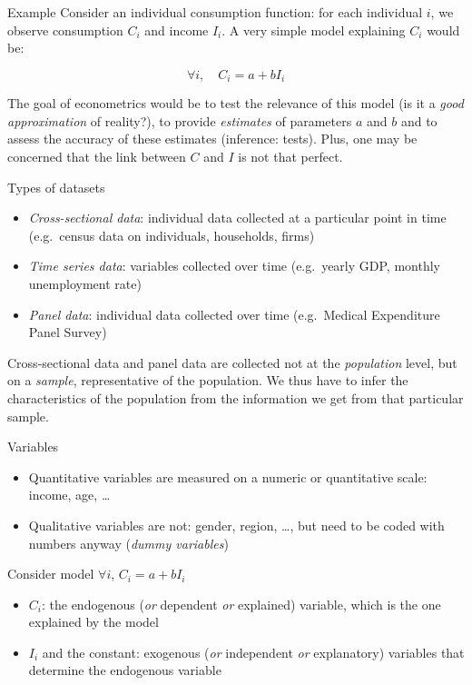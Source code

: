 \documentclass[aspectratio=169]{beamer}
\begin{document}
\begin{frame}{Example}
Consider an individual consumption function: for each individual $i$, we observe consumption $C_i$ and income $I_i$. A very simple model explaining $C_i$ would be:

\[\forall i, \quad C_i = a + bI_i\]

The goal of econometrics would be to test the relevance of this model (is it a \textit{good approximation} of reality?), to provide \textit{estimates} of parameters $a$ and $b$ and to assess the accuracy of these estimates (inference: tests). Plus, one may be concerned that the link between $C$ and $I$ is not that perfect.
\end{frame}

\begin{frame}{Types of datasets}
\begin{itemize}
    \item \textit{Cross-sectional data}: individual data collected at a particular point in time (e.g.\ census data on individuals, households, firms)
    \item \textit{Time series data}: variables collected over time (e.g.\ yearly GDP, monthly unemployment rate)
    \item \textit{Panel data}: individual data collected over time (e.g.\ Medical Expenditure Panel Survey)
\end{itemize}

\vspace{0.5cm}

Cross-sectional data and panel data are collected not at the \textit{population} level, but on a \textit{sample}, representative of the population. We thus have to infer the characteristics of the population from the information we get from that particular sample.
\end{frame}

\begin{frame}{Variables}
\begin{itemize}
    \item Quantitative variables are measured on a numeric or quantitative scale: income, age, \dots
    \item Qualitative variables are not: gender, region, \dots, but need to be coded with numbers anyway (\textit{dummy variables})
\end{itemize}

\vspace{0.5cm}

Consider model $\forall i$, $C_i = a + bI_i$
\begin{itemize}
    \item $C_i$: the endogenous (\textit{or} dependent \textit{or} explained) variable, which is the one explained by the model
    \item $I_i$ and the constant: exogenous (\textit{or} independent \textit{or} explanatory) variables that determine the endogenous variable
\end{itemize}
\end{frame}
\end{document}
